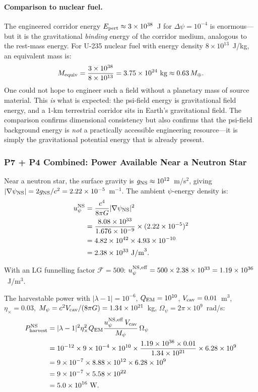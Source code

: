 \documentclass[aps,prd,twocolumn,superscriptaddress,nofootinbib]{revtex4-2}
\newcommand{\Opsi}{\Omega_\psi}
\begin{document}
\paragraph{Comparison to nuclear fuel.}
The engineered corridor energy $E_{\rm pert} \approx 3\times10^{38}$~J for
$\Delta\psi = 10^{-4}$ is enormous---but it is the gravitational \emph{binding}
energy of the corridor medium, analogous to the rest-mass energy.  For U-235
nuclear fuel with energy density $8\times10^{13}$~J/kg, an equivalent mass is:
\begin{equation}
M_{\rm equiv} = \frac{3\times10^{38}}{8\times10^{13}}
= 3.75\times10^{24}~\text{kg}\approx 0.63\,M_\oplus.
\end{equation}
One could not hope to engineer such a field without a planetary mass of
source material.  This \emph{is} what is expected: the psi-field energy is
gravitational field energy, and a 1-km terrestrial corridor sits in
Earth's gravitational field.  The comparison confirms dimensional consistency
but also confirms that the psi-field background energy is \emph{not} a
practically accessible engineering resource---it is simply the gravitational
potential energy that is already present.

\subsubsection{P7 + P4 Combined: Power Available Near a Neutron Star}
\label{sec:ns-harvest}

Near a neutron star, the surface gravity is $g_{\rm NS} \approx 10^{12}$~m/s$^2$,
giving $|\nabla\psi_{\rm NS}| = 2g_{\rm NS}/c^2 = 2.22\times10^{-5}$~m$^{-1}$.
The ambient $\psi$-energy density is:
\begin{align}
u_\psi^{\rm NS}
&= \frac{c^4}{8\pi G}|\nabla\psi_{\rm NS}|^2 \notag\\
&= \frac{8.08\times10^{33}}{1.676\times10^{-9}}\times(2.22\times10^{-5})^2 \notag\\
&= 4.82\times10^{42}\times4.93\times10^{-10} \notag\\
&= 2.38\times10^{33}~\text{J/m}^3.
\end{align}

With an LG funnelling factor $\mathcal{F} = 500$:
$u_\psi^{\rm NS,eff} = 500\times2.38\times10^{33} = 1.19\times10^{36}$~J/m$^3$.

The harvestable power with $|\lambda-1| = 10^{-6}$, $Q_{\rm EM} = 10^{10}$,
$V_{\rm cav} = 0.01$~m$^3$, $\eta_\times = 0.03$,
$M_\psi = c^2 V_{\rm cav}/(8\pi G) = 1.34\times10^{21}$~kg,
$\Opsi = 2\pi\times10^9$~rad/s:
\begin{align}
P_{\rm harvest}^{\rm NS}
&= |\lambda-1|^2\eta_\times^2 Q_{\rm EM}
\frac{u_\psi^{\rm NS,eff}\,V_{\rm cav}}{M_\psi}\,\Opsi \notag\\
&= 10^{-12}\times9\times10^{-4}\times10^{10}
\times\frac{1.19\times10^{36}\times0.01}{1.34\times10^{21}}
\times6.28\times10^9 \notag\\
&= 9\times10^{-7}\times8.88\times10^{12}\times6.28\times10^9 \notag\\
&= 9\times10^{-7}\times5.58\times10^{22} \notag\\
&= 5.0\times10^{16}~\text{W}.
\end{align}
\end{document}
